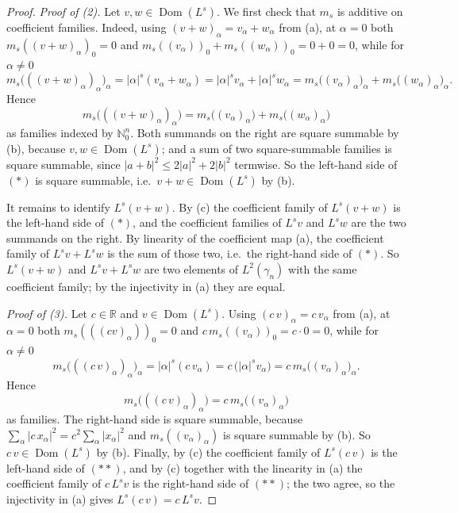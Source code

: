\begin{proof}
\emph{Proof of (2).}  Let $v, w \in \operatorname{Dom}(L^s)$.  We first check that
$m_s$ is additive on coefficient families.  Indeed, using
$(v+w)_\alpha = v_\alpha + w_\alpha$ from (a), at $\alpha = 0$ both
$m_s((v+w)_\alpha)_0 = 0$ and
$m_s((v_\alpha))_0 + m_s((w_\alpha))_0 = 0 + 0 = 0$, while for $\alpha \neq 0$
\[
  m_s\bigl(((v+w)_\alpha)_\alpha\bigr)_\alpha
    = |\alpha|^s (v_\alpha + w_\alpha)
    = |\alpha|^s v_\alpha + |\alpha|^s w_\alpha
    = m_s\bigl((v_\alpha)_\alpha\bigr)_\alpha
      + m_s\bigl((w_\alpha)_\alpha\bigr)_\alpha .
\]
Hence
\[
  m_s\bigl(((v+w)_\alpha)_\alpha\bigr)
    = m_s\bigl((v_\alpha)_\alpha\bigr) + m_s\bigl((w_\alpha)_\alpha\bigr)
  \tag{$*$}
\]
as families indexed by $\mathbb{N}_0^n$.  Both summands on the right are square
summable by (b), because $v, w \in \operatorname{Dom}(L^s)$; and a sum of two
square-summable families is square summable, since
$|a+b|^2 \leq 2|a|^2 + 2|b|^2$ termwise.  So the left-hand side of $(*)$ is
square summable, i.e.\ $v + w \in \operatorname{Dom}(L^s)$ by (b).

It remains to identify $L^s(v+w)$.  By (c) the coefficient family of
$L^s(v+w)$ is the left-hand side of $(*)$, and the coefficient families of
$L^s v$ and $L^s w$ are the two summands on the right.  By linearity of the
coefficient map (a), the coefficient family of $L^s v + L^s w$ is the sum of
those two, i.e.\ the right-hand side of $(*)$.  So $L^s(v+w)$ and
$L^s v + L^s w$ are two elements of $L^2(\gamma_n)$ with the same coefficient
family; by the injectivity in (a) they are equal.

\emph{Proof of (3).}  Let $c \in \mathbb{R}$ and $v \in \operatorname{Dom}(L^s)$.
Using $(c\,v)_\alpha = c\,v_\alpha$ from (a), at $\alpha = 0$ both
$m_s(((c v)_\alpha))_0 = 0$ and $c\,m_s((v_\alpha))_0 = c\cdot 0 = 0$, while for
$\alpha \neq 0$
\[
  m_s\bigl(((c\,v)_\alpha)_\alpha\bigr)_\alpha
    = |\alpha|^s (c\,v_\alpha)
    = c\,\bigl(|\alpha|^s v_\alpha\bigr)
    = c\, m_s\bigl((v_\alpha)_\alpha\bigr)_\alpha .
\]
Hence
\[
  m_s\bigl(((c\,v)_\alpha)_\alpha\bigr)
    = c\, m_s\bigl((v_\alpha)_\alpha\bigr)
  \tag{$**$}
\]
as families.  The right-hand side is square summable, because
$\sum_\alpha |c\,x_\alpha|^2 = c^2 \sum_\alpha |x_\alpha|^2$ and
$m_s((v_\alpha)_\alpha)$ is square summable by (b).  So
$c\,v \in \operatorname{Dom}(L^s)$ by (b).  Finally, by (c) the coefficient
family of $L^s(c\,v)$ is the left-hand side of $(**)$, and by (c) together with
the linearity in (a) the coefficient family of $c\,L^s v$ is the right-hand side
of $(**)$; the two agree, so the injectivity in (a) gives
$L^s(c\,v) = c\,L^s v$.
\end{proof}
